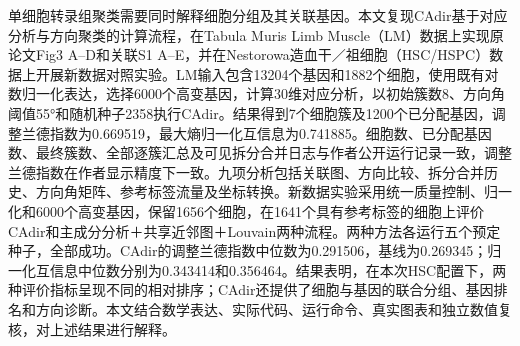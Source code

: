 单细胞转录组聚类需要同时解释细胞分组及其关联基因。本文复现CAdir基于对应分析与方向聚类的计算流程，在Tabula Muris Limb Muscle（LM）数据上实现原论文Fig3 A–D和关联S1 A–E，并在Nestorowa造血干／祖细胞（HSC/HSPC）数据上开展新数据对照实验。LM输入包含\allowbreak{}13204个基因和\allowbreak{}1882个细胞，使用既有对数归一化表达，选择\allowbreak{}6000个高变基因，计算\allowbreak{}30维对应分析，以初始簇数\allowbreak{}8、方向角阈值\allowbreak{}55°和随机种子\allowbreak{}2358执行CAdir。结果得到\allowbreak{}7个细胞簇及\allowbreak{}1200个已分配基因，调整兰德指数为\allowbreak{}0.669519，最大熵归一化互信息为\allowbreak{}0.741885。细胞数、已分配基因数、最终簇数、全部逐簇汇总及可见拆分合并日志与作者公开运行记录一致，调整兰德指数在作者显示精度下一致。九项分析包括关联图、方向比较、拆分合并历史、方向角矩阵、参考标签流量及坐标转换。新数据实验采用统一质量控制、归一化和\allowbreak{}6000个高变基因，保留\allowbreak{}1656个细胞，在\allowbreak{}1641个具有参考标签的细胞上评价CAdir和主成分分析＋共享近邻图＋Louvain两种流程。两种方法各运行五个预定种子，全部成功。CAdir的调整兰德指数中位数为\allowbreak{}0.291506，基线为\allowbreak{}0.269345；归一化互信息中位数分别为\allowbreak{}0.343414和\allowbreak{}0.356464。结果表明，在本次HSC配置下，两种评价指标呈现不同的相对排序；CAdir还提供了细胞与基因的联合分组、基因排名和方向诊断。本文结合数学表达、实际代码、运行命令、真实图表和独立数值复核，对上述结果进行解释。
\par
